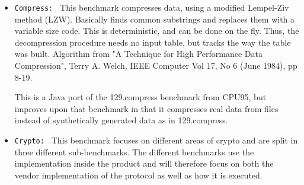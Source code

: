 \begin{itemize}
  \item \texttt{Compress: } This benchmark compresses data, using a modified Lempel-Ziv method (LZW). Basically finds common substrings and replaces them with a variable size code. This is deterministic, and can be done on the fly. Thus, the decompression procedure needs no input table, but tracks the way the table was built. Algorithm from "A Technique for High Performance Data Compression", Terry A. Welch, IEEE Computer Vol 17, No 6 (June 1984), pp 8-19.

This is a Java port of the 129.compress benchmark from CPU95, but improves upon that benchmark in that it compresses real data from files instead of synthetically generated data as in 129.compress. 
 \item \texttt{Crypto: } This benchmark focuses on different areas of crypto and are split in three different sub-benchmarks. The different benchmarks use the implementation inside the product and will therefore focus on both the vendor implementation of the protocol as well as how it is executed.


\end{itemize}
